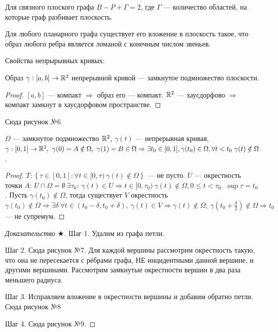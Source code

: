 \begin{theorem}
    Для связного плоского графа $B - P + \Gamma = 2$, где $\Gamma$ — количество областей, на которые граф разбивает плоскость.
\end{theorem}

\begin{theorem}[$\bigstar$]
    Для любого планарного графа существует его вложение в плоскость такое, что образ любого ребра является ломаной с конечным числом звеньев.
\end{theorem}

Свойства непрырывных кривых:

\begin{lemma}[1]
    Образ $\gamma: [a,b] \to \mathbb{R}^2$ непрерывной кривой — замкнутое подмножество плоскости.
\end{lemma}
\begin{proof}
    $\left[a,b\right]$ — компакт $\Rightarrow$ образ его — компакт. $\mathbb{R}^2$ — хаусдорфово $\Rightarrow$ компакт замкнут в хаусдорфовом пространстве.
\end{proof}

Сюда рисунок №6

\begin{lemma}[2]
    $\Omega$ — замкнутое подмножество $\mathbb{R}^2$, $\gamma(t)$ — непрерывная кривая, $\gamma: [0,1] \to \R^2, \ \gamma(0) = A \notin \Omega, \ \gamma(1) = B \in \Omega \Rightarrow \exists t_0 \in  [0,1], \gamma(t_0) \in \Omega, \forall t < t_0 \ \gamma(t) \notin \Omega$.
\end{lemma}
\begin{proof}
    $T: \left\{
        \tau \in [0,1]: \forall t \in [0, \tau) \ \gamma(t) \notin \Omega
    \right\}$ — не пусто.
    $U$ — окрестность точки $A$: $U \cap \Omega = \emptyset \ \exists \tau_0: \ \gamma(t) \in U \Rightarrow t \in [0, \tau_0) \ \gamma(t) \notin \Omega, 0 \leq t < \tau_0$.
    $\sup{\tau} = t_0$. Пусть $\gamma(t_0) \notin \Omega$, тогда существует $V$ окрестность $\gamma(t_0) \notin \Omega \Rightarrow \exists \delta \ \forall t \in (t_0 - \delta, t_0 + \delta), \ \gamma(t) \in V \Rightarrow \gamma(t) \notin \Omega, \ \gamma(t_0 + \frac{\delta}{2}) \notin \Omega \Rightarrow t_0$ — не супремум.
\end{proof}

\begin{proof}[Доказательство $\bigstar$]
    Шаг 1. Удалим из графа петли.
    
    Шаг 2. Сюда рисунок №7. Для каждой вершины рассмотрим окрестность такую, что она не пересекается с рёбрами графа, НЕ инцидентными данной вершине, и другими вершинами. Рассмотрим замкнутые окрестности вершин в два раза меньшего радиуса.

    Шаг 3. Исправляем вложение в окрестности вершины и добавим обратно петли. Сюда рисунок №8

    Шаг 4. Сюда рисунок №9.
\end{proof}